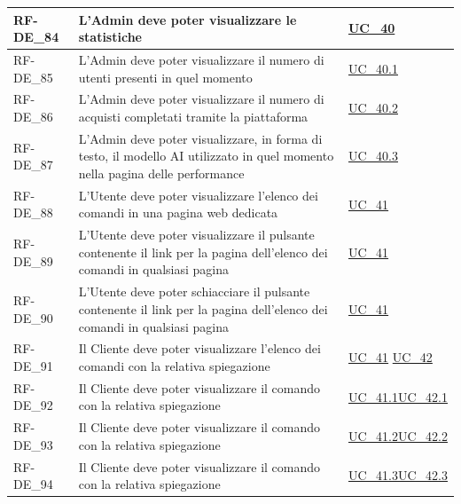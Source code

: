 \begin{longtable}{|>{\raggedright}p{}|>{\raggedright\arraybackslash}p{}|>{\raggedright\arraybackslash}p{}|}
	\hline
	RF-DE\_84 \hypertarget{rf-de_84} & L'Admin deve poter visualizzare le statistiche & \hyperref[uc_40]{UC\_40} \\
	\hline
	RF-DE\_85 \hypertarget{rf-de_85} & L'Admin deve poter visualizzare il numero di utenti presenti in quel momento & \hyperref[uc_40.1]{UC\_40.1} \\
	\hline
	RF-DE\_86 \hypertarget{rf-de_86} & L'Admin deve poter visualizzare il numero di acquisti completati tramite la piattaforma & \hyperref[uc_40.2]{UC\_40.2} \\
	\hline
	RF-DE\_87 \hypertarget{rf-de_87} & L'Admin deve poter visualizzare, in forma di testo, il modello AI utilizzato in quel momento nella pagina delle performance & \hyperref[uc_40.3]{UC\_40.3} \\
	\hline
	RF-DE\_88 \hypertarget{rf-de_88} & L'Utente deve poter visualizzare l'elenco dei comandi in una pagina web dedicata & \hyperref[uc_41]{UC\_41} \\
	\hline
	RF-DE\_89 \hypertarget{rf-de_89} & L'Utente deve poter visualizzare il pulsante contenente il link per la pagina dell'elenco dei comandi in qualsiasi pagina & \hyperref[uc_41]{UC\_41} \\
	\hline
	RF-DE\_90 \hypertarget{rf-de_90} & L'Utente deve poter schiacciare il pulsante contenente il link per la pagina dell'elenco dei comandi in qualsiasi pagina & \hyperref[uc_41]{UC\_41} \\
	\hline
	RF-DE\_91 \hypertarget{rf-de_91} & Il Cliente deve poter visualizzare l'elenco dei comandi con la relativa spiegazione & \hyperref[uc_41]{UC\_41} \newline \hyperref[uc_42]{UC\_42}\\
	\hline
	RF-DE\_92 \hypertarget{rf-de_92} & Il Cliente deve poter visualizzare il comando \vr{/duplica} con la relativa spiegazione & \hyperref[uc_41.1]{UC\_41.1}\newline \hyperref[uc_42.1]{UC\_42.1} \\
	\hline
	RF-DE\_93 \hypertarget{rf-de_93} & Il Cliente deve poter visualizzare il comando \vr{/carrello} con la relativa spiegazione & \hyperref[uc_41.2]{UC\_41.2}\newline \hyperref[uc_42.2]{UC\_42.2} \\
	\hline
	RF-DE\_94 \hypertarget{rf-de_94} & Il Cliente deve poter visualizzare il comando \vr{/duplica\{xx\}} con la relativa spiegazione & \hyperref[uc_41.3]{UC\_41.3}\newline \hyperref[uc_42.3]{UC\_42.3} \\
	\hline

\end{longtable}
